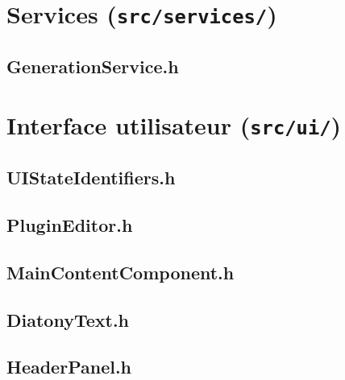\newpage
\section{Services (\texttt{src/services/})}

\subsection{GenerationService.h}


\newpage
\section{Interface utilisateur (\texttt{src/ui/})}

\subsection{UIStateIdentifiers.h}


\subsection{PluginEditor.h}


\subsection{MainContentComponent.h}


\subsection{DiatonyText.h}


\subsection{HeaderPanel.h}


